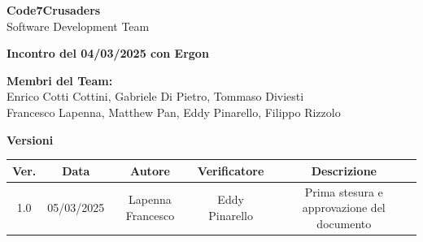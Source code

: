 \documentclass{article}
\begin{document}
\begin{titlepage}
    {\Huge \textbf{Code7Crusaders}}\\
    \vspace{0.5cm}
    {\Large Software Development Team}\\
    \vspace{2cm}
    
    {\large \textbf{Incontro del 04/03/2025 con Ergon}}\\ %
    \vspace{5cm}                           %
    
    
    \textbf{Membri del Team:}\\
    Enrico Cotti Cottini, Gabriele Di Pietro, Tommaso Diviesti \\
    Francesco Lapenna, Matthew Pan, Eddy Pinarello, Filippo Rizzolo \\
    \vspace{0.5cm}
    
    \vspace{1cm}
\end{titlepage}



\newpage
\begin{table}[h!]
\centering
\textbf{Versioni} \\ %
\vspace{2mm} %
\begin{tabular}{|c|c|c|c|c|}
    \hline
    \textbf{Ver.} & \textbf{Data} & \textbf{Autore} & \textbf{Verificatore} & \textbf{Descrizione} \\
    \hline
    1.0 & 05/03/2025 & Lapenna Francesco & Eddy Pinarello & Prima stesura e approvazione del documento \\ 
    \hline                                  %
\end{tabular}
\end{table}



\newpage
\tableofcontents
\end{document}
